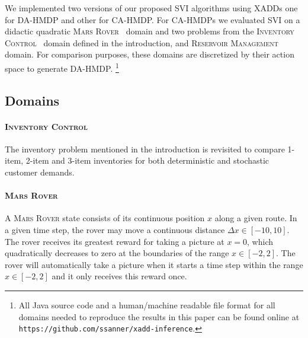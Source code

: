 \documentclass[twoside,11pt]{article}
\newcommand{\MarsRover}{\textsc{Mars Rover }}
\newcommand{\InventoryControl}{\textsc{Inventory Control }}
\newcommand{\WaterReservoir}{\textsc{Reservoir Management }}
\begin{document}
We implemented two versions of our proposed SVI algorithms using XADDs one for DA-HMDP and other for CA-HMDP.
For CA-HMDPs we evaluated SVI on a didactic quadratic
\MarsRover\ domain and two problems from the \InventoryControl\ domain defined in the introduction, and \WaterReservoir domain. For comparison purposes, these domains are discretized by their action space to generate DA-HMDP. \footnote{All Java source code and a human/machine readable file format for all domains needed to reproduce
the results in this paper can be found online at
\texttt{https://github.com/ssanner/xadd-inference}.}

\subsection{Domains}

\paragraph{\InventoryControl}
The inventory problem mentioned in the introduction is revisited to compare 1-item, 2-item and 3-item inventories for both deterministic and stochastic customer demands. 
\paragraph{\MarsRover}
A \MarsRover state consists of its continuous position $x$ along a given route.  In a given time step, the rover may move a continuous distance $\Delta x \in [-10,10]$.  The rover receives its greatest reward for taking a picture at $x=0$, which quadratically decreases to zero at the boundaries of the range $x \in [-2,2]$.  The rover will
automatically take a picture when it starts a time step within the range $x \in [-2,2]$ and it only receives this reward once.
\end{document}
